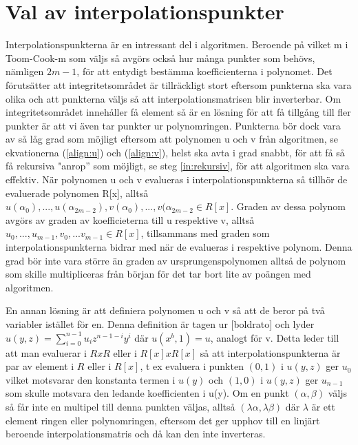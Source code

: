 \section{Val av interpolationspunkter}
Interpolationspunkterna är en intressant del i algoritmen. Beroende på vilket m
i Toom-Cook-m som väljs så avgörs också hur många punkter som behövs, nämligen
$2m-1$, för att entydigt bestämma koefficienterna i polynomet. Det förutsätter
att integritetsområdet är tillräckligt stort eftersom punkterna ska vara olika
och att punkterna väljs så att interpolationsmatrisen blir inverterbar. Om
integritetsområdet innehåller få element så är en lösning för att få tillgång
till fler punkter är att vi även tar punkter ur polynomringen. Punkterna bör
dock vara av så låg grad som möjligt eftersom att polynomen u och v från
algoritmen, se ekvationerna (\ref {align:u}) och (\ref{align:v}), helst ska
avta i grad snabbt, för att få så få rekursiva "anrop'' som möjligt, se steg
\ref{in:rekursiv}, för att algoritmen ska vara effektiv. När polynomen u och v
evalueras i interpolationspunkterna så tillhör de evaluerade polynomen R[x],
alltså $u(\alpha_0),...,u(\alpha_{2m-2}),v(\alpha_0),...,v(\alpha_{2m-2} \in
R[x]$. Graden av dessa polynom avgörs av graden av koefficieterna till u
respektive v, alltså $u_0,...,u_{m-1},v_0,...v_{m-1} \in R[x]$,  tillsammans
med graden som interpolationspunkterna bidrar med när de evalueras i respektive
polynom. Denna grad bör inte vara större än graden av ursprungenspolynomen
alltså de polynom som skille multipliceras från början för det tar bort lite av
poängen med algoritmen.

En annan lösning är att definiera polynomen u och v så att de beror på två
variabler istället för en. Denna definition är tagen ur [boldrato] och lyder
$u(y,z) = \displaystyle\sum\limits_{i=0}^{n-1} {u_iz^{n-1-i}y^i}$ där $u(x^b,1)
= u$, analogt för v. Detta leder till att man evaluerar i $RxR$ eller i
$R[x]xR[x]$ så att interpolationspunkterna är par av element i $R$ eller i
$R[x]$, t ex evaluera i punkten $(0,1)$ i $u(y,z)$ ger $u_0$ vilket motsvarar
den konstanta termen i $u(y)$ och $(1,0)$ i $u(y,z)$ ger $u_{n-1}$ som skulle
motsvara den ledande koefficienten i u(y). Om en punkt $(\alpha,\beta)$ väljs
så får inte en multipel till denna punkten väljas, alltså
$(\lambda\alpha,\lambda\beta)$ där $\lambda$ är ett element ringen eller
polynomringen, eftersom det ger upphov till en linjärt beroende
interpolationsmatris och då kan den inte inverteras.
